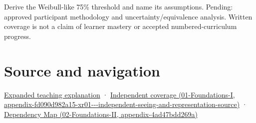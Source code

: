 Derive the Weibull-like 75\% threshold and name its assumptions. Pending: approved participant methodology and uncertainty/equivalence analysis. Written coverage is not a claim of learner mastery or accepted numbered-curriculum progress.

\section{Source and navigation}\label{appendix-1759f03e8ce7-source-and-navigation}

\href{Continuous\%20Notes/University\%20-\%20Worlds,\%20Images\%20and\%20Inference\%20-\%20Graphics,\%20Vision\%20and\%20Photography\#A\%20threshold\%20is\%20evidence\%20from\%20a\%20procedure,\%20not\%20a\%20universal\%20border}{Expanded teaching explanation} · \href{../01-Foundations-I/main.pdf\#nameddest=appendix-fd090d982a15-xr01---independent-seeing-and-representation-source}{Independent coverage (01-Foundations-I, appendix-fd090d982a15-xr01-\/-\/-independent-seeing-and-representation-source)} · \href{../02-Foundations-II/main.pdf\#nameddest=appendix-4ad47bdd269a}{Dependency Map (02-Foundations-II, appendix-4ad47bdd269a)}
